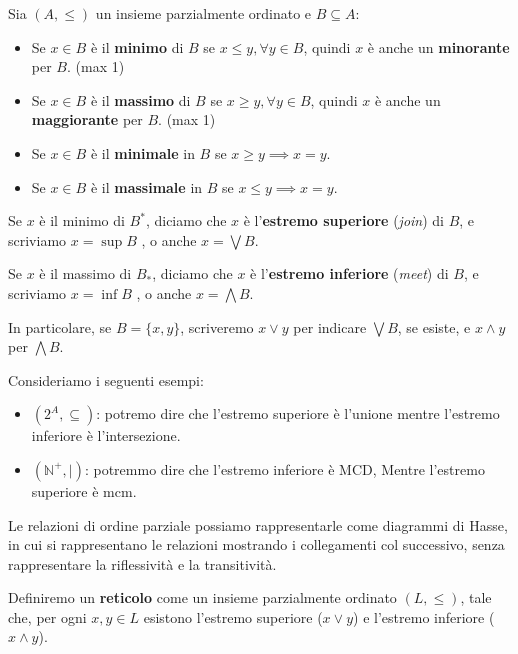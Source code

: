\begin{definizione}
    Sia $(A,\leq)$ un insieme parzialmente ordinato e $B \subseteq A$:
    \begin{itemize}
        \item Se $x \in B$ è il \textbf{minimo} di $B$ se $x \leq y, \forall y
                  \in B$, quindi $x$ è anche un \textbf{minorante} per $B$. (max 1)
        \item Se $x \in B$ è il \textbf{massimo} di $B$ se $x \geq y,\forall y
                  \in B$, quindi $x$ è anche un \textbf{maggiorante} per $B$. (max 1)
        \item Se $x \in B$ è il \textbf{minimale} in $B$ se $x \geq y \implies
                  x = y$.
        \item Se $x \in B$ è il \textbf{massimale} in $B$ se $x \leq y \implies
                  x = y$.
    \end{itemize}
\end{definizione}
\begin{definizione}
    Se $x$ è il minimo di $B^\ast$, diciamo che $x$ è l'\textbf{estremo superiore}
    (\textit{join}) di $B$, e scriviamo $x = \sup B$ , o anche $x = \bigvee B$.

    Se $x$ è il massimo di $B_\ast$, diciamo che $x$ è l'\textbf{estremo inferiore}
    (\textit{meet}) di $B$, e scriviamo $x = \inf B$ , o anche $x = \bigwedge B$.

    In particolare, se $B = \{x, y\}$, scriveremo $x \lor y$ per indicare $\bigvee
        B$, se esiste, e $x \land y$ per $\bigwedge B$.
\end{definizione}
\begin{esempio}
    Consideriamo i seguenti esempi:
    \begin{itemize}
        \item $(2^A, \subseteq)$: potremo dire che l'estremo superiore è l'unione
              mentre l'estremo inferiore è l'intersezione.
        \item $(\mathbb{N}^+,|)$: potremmo dire che l'estremo inferiore è MCD, Mentre
              l'estremo superiore è mcm.
    \end{itemize}
\end{esempio}
Le relazioni di ordine parziale possiamo rappresentarle come diagrammi di Hasse,
in cui si rappresentano le relazioni mostrando i collegamenti col successivo,
senza rappresentare la riflessività e la transitività.
\begin{definizione}
    Definiremo un \textbf{reticolo} come un insieme parzialmente ordinato $(L,
        \leq)$, tale che, per ogni $x,y\in L$ esistono l'estremo superiore ($x \lor y$) e
    l'estremo inferiore ($x \land y$).
\end{definizione}
